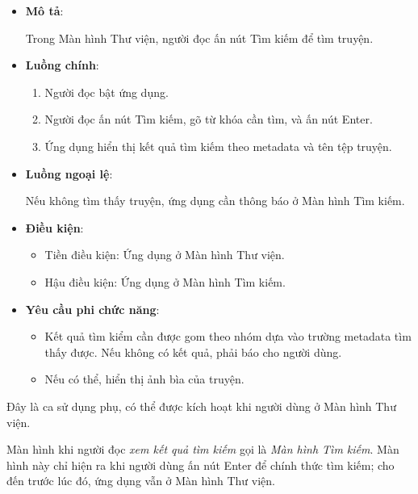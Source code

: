 \documentclass[../../thesis]{subfiles}
\begin{document}
\begin{itemize}
    \item
        \textbf{Mô tả}:

        Trong Màn hình Thư viện, người đọc ấn nút Tìm kiếm để tìm truyện.
    \item
        \textbf{Luồng chính}:

        \begin{enumerate}
            \item
                Người đọc bật ứng dụng.
            \item
                Người đọc ấn nút Tìm kiếm, gõ từ khóa cần tìm, và ấn nút Enter.
            \item
                Ứng dụng hiển thị kết quả tìm kiếm theo metadata và tên tệp
                truyện.
        \end{enumerate}
    \item
        \textbf{Luồng ngoại lệ}:

        Nếu không tìm thấy truyện, ứng dụng cần thông báo ở Màn hình Tìm kiếm.
    \item
        \textbf{Điều kiện}:

        \begin{itemize}
            \item
                Tiền điều kiện: Ứng dụng ở Màn hình Thư viện.
            \item
                Hậu điều kiện: Ứng dụng ở Màn hình Tìm kiếm.
        \end{itemize}
    \item
        \textbf{Yêu cầu phi chức năng}:

        \begin{itemize}
            \item
                Kết quả tìm kiểm cần được gom theo nhóm dựa vào trường metadata
                tìm thấy được. Nếu không có kết quả, phải báo cho người dùng.
            \item
                Nếu có thể, hiển thị ảnh bìa của truyện.
        \end{itemize}
  \end{itemize}

Đây là ca sử dụng phụ, có thể được kích hoạt khi người dùng ở Màn hình Thư viện.

Màn hình khi người đọc \emph{xem kết quả tìm kiếm} gọi là \emph{Màn hình Tìm
kiếm}. Màn hình này chỉ hiện ra khi người dùng ấn nút Enter để chính thức tìm
kiếm; cho đến trước lúc đó, ứng dụng vẫn ở Màn hình Thư viện.
\end{document}
